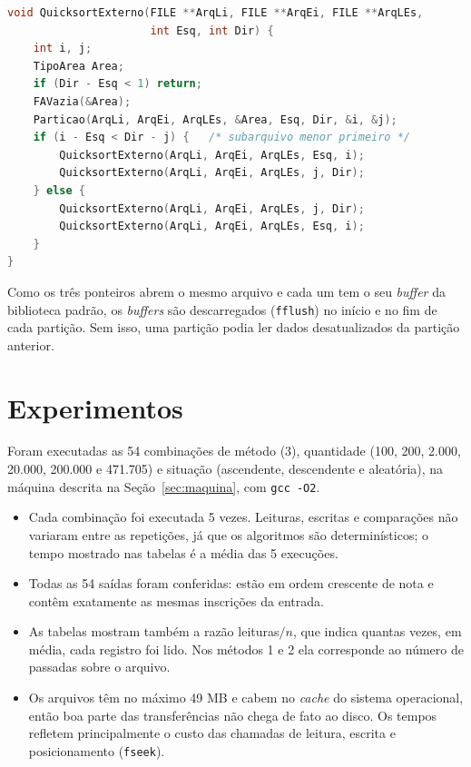 \documentclass{article}
\begin{document}
\begin{lstlisting}[caption={Recursão do Quicksort externo (quicksort.c).},label={lst:qs},language=C]
void QuicksortExterno(FILE **ArqLi, FILE **ArqEi, FILE **ArqLEs,
                      int Esq, int Dir) {
    int i, j;
    TipoArea Area;
    if (Dir - Esq < 1) return;
    FAVazia(&Area);
    Particao(ArqLi, ArqEi, ArqLEs, &Area, Esq, Dir, &i, &j);
    if (i - Esq < Dir - j) {   /* subarquivo menor primeiro */
        QuicksortExterno(ArqLi, ArqEi, ArqLEs, Esq, i);
        QuicksortExterno(ArqLi, ArqEi, ArqLEs, j, Dir);
    } else {
        QuicksortExterno(ArqLi, ArqEi, ArqLEs, j, Dir);
        QuicksortExterno(ArqLi, ArqEi, ArqLEs, Esq, i);
    }
}
\end{lstlisting}

Como os três ponteiros abrem o mesmo arquivo e cada um tem o seu \emph{buffer} da biblioteca padrão, os \emph{buffers} são descarregados (\texttt{fflush}) no início e no fim de cada partição. Sem isso, uma partição podia ler dados desatualizados da partição anterior.

\clearpage
\section{Experimentos}

Foram executadas as 54 combinações de método (3), quantidade (100, 200, 2.000, 20.000, 200.000 e 471.705) e situação (ascendente, descendente e aleatória), na máquina descrita na Seção~\ref{sec:maquina}, com \texttt{gcc -O2}.

\begin{itemize}
    \item Cada combinação foi executada 5 vezes. Leituras, escritas e comparações não variaram entre as repetições, já que os algoritmos são determinísticos; o tempo mostrado nas tabelas é a média das 5 execuções.
    \item Todas as 54 saídas foram conferidas: estão em ordem crescente de nota e contêm exatamente as mesmas inscrições da entrada.
    \item As tabelas mostram também a razão leituras$/n$, que indica quantas vezes, em média, cada registro foi lido. Nos métodos 1 e 2 ela corresponde ao número de passadas sobre o arquivo.
    \item Os arquivos têm no máximo 49 MB e cabem no \emph{cache} do sistema operacional, então boa parte das transferências não chega de fato ao disco. Os tempos refletem principalmente o custo das chamadas de leitura, escrita e posicionamento (\texttt{fseek}).
\end{itemize}
\end{document}
